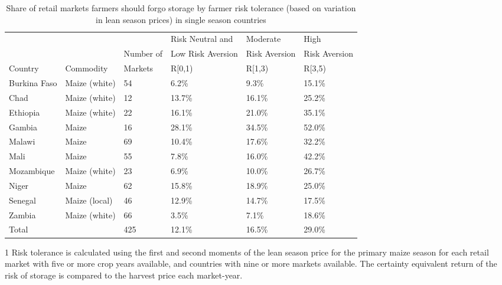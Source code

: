 \begin{table}[ht]
	\begin{threeparttable}[t]
		\centering
		\caption{Share of retail markets farmers should forgo storage by farmer risk tolerance (based on variation in lean season prices) in single season countries}
		\label{tab:risk_price}
		\begin{tabular}{|lll|lll|}
			\hline 
			&   & & Risk Neutral and & Moderate & High \\ 
			& & Number of  & Low Risk Aversion & Risk Aversion &  Risk Aversion\\ 
			Country& Commodity & Markets& R\in[0,1) &  R\in[1,3) & R\in[3,5) \\ 
			\hline
Burkina Faso & Maize (white) & 54 & 6.2\% & 9.3\% & 15.1\% \\ 
  Chad & Maize (white) & 12 & 13.7\% & 16.1\% & 25.2\% \\ 
  Ethiopia & Maize (white) & 22 & 16.1\% & 21.0\% & 35.1\% \\ 
  Gambia & Maize & 16 & 28.1\% & 34.5\% & 52.0\% \\ 
  Malawi & Maize & 69 & 10.4\% & 17.6\% & 32.2\% \\ 
  Mali & Maize & 55 & 7.8\% & 16.0\% & 42.2\% \\ 
  Mozambique & Maize (white) & 23 & 6.9\% & 10.0\% & 26.7\% \\ 
  Niger & Maize & 62 & 15.8\% & 18.9\% & 25.0\% \\ 
  Senegal & Maize (local) & 46 & 12.9\% & 14.7\% & 17.5\% \\ 
  Zambia & Maize (white) & 66 & 3.5\% & 7.1\% & 18.6\% \\ 
  \hline
  Total &  & 425 & 12.1\% & 16.5\% & 29.0\% \\ 
   \hline 
\end{tabular}
\begin{tablenotes}
\item [1] \footnotesize Risk tolerance is calculated using the first and second moments of the lean season price for the primary maize season for each retail market with five or more crop years available, and countries with nine or more markets available. The certainty equivalent return of the risk of storage is compared to the harvest price each market-year. 
\end{tablenotes}
\end{threeparttable}
\end{table}

